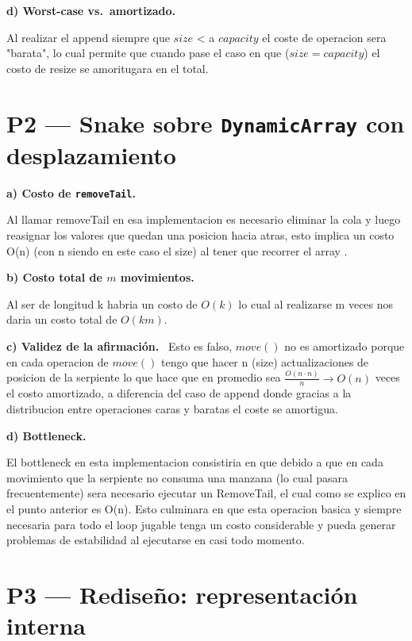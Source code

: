 \documentclass[11pt,a4paper]{article}
\newcommand{\sub}[2]{\medskip\par\noindent\textbf{#1) #2.}\ }
\begin{document}
\sub{d}{Worst-case vs.\ amortizado}

Al realizar el append siempre que $size$ < a $capacity$ el coste de operacion sera "barata", lo cual permite que cuando pase el caso en que ($size = capacity$) el costo de resize se amoritugara en el total.

\section*{P2 --- Snake sobre \texttt{DynamicArray} con desplazamiento}

\sub{a}{Costo de \texttt{removeTail}}

Al llamar removeTail en esa implementacion es necesario eliminar la cola y luego reasignar los valores que quedan una posicion hacia atras, esto implica un costo O(n) (con n siendo en este caso el size) al tener que recorrer el array .

\sub{b}{Costo total de $m$ movimientos}

Al ser de longitud k habria un costo de $O(k)$ lo cual al realizarse m veces nos daria un costo total de $O(km)$.

\sub{c}{Validez de la afirmación} %
Esto es falso, $move()$ no es amortizado porque en cada operacion de $move()$ tengo que hacer n (size) actualizaciones de posicion de la serpiente lo que hace que en promedio sea $\frac{O(n \cdot n)}{n} \rightarrow O(n)$ veces el costo amortizado, a diferencia del caso de append donde gracias a la distribucion entre operaciones caras y baratas el coste se amortigua.


\sub{d}{Bottleneck} %

El bottleneck en esta implementacion consistiria en que debido a que en cada movimiento que la serpiente no consuma una manzana (lo cual pasara frecuentemente) sera necesario ejecutar un RemoveTail, el cual como se explico en el punto anterior es O(n).
Esto culminara en que esta operacion basica y siempre necesaria para todo el loop jugable tenga un costo considerable y pueda generar problemas de estabilidad al ejecutarse en casi todo momento.

\section*{P3 --- Rediseño: representación interna}
\end{document}
